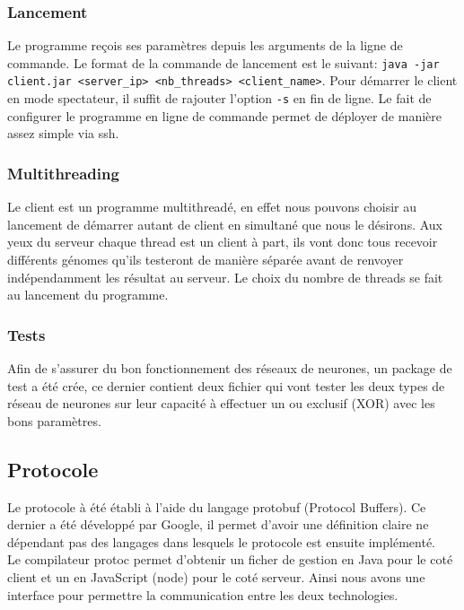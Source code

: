 \documentclass{article}
\begin{document}
\subsubsection{Lancement}

Le programme reçois ses paramètres depuis les arguments de la ligne de commande. Le format de la commande de lancement est le suivant: \texttt{java -jar client.jar <server\_ip> <nb\_threads> <client\_name>}. Pour démarrer le client en mode spectateur, il suffit de rajouter l'option \texttt{-s} en fin de ligne. Le fait de configurer le programme en ligne de commande permet de déployer de manière assez simple via ssh.  

\subsubsection{Multithreading}

Le client est un programme multithreadé, en effet nous pouvons choisir au lancement de démarrer autant de client en simultané que nous le désirons. Aux yeux du serveur chaque thread est un client à part, ils vont donc tous recevoir différents génomes qu'ils testeront de manière séparée avant de renvoyer indépendamment les résultat au serveur. Le choix du nombre de threads se fait au lancement du programme.

\subsubsection{Tests}

Afin de s'assurer du bon fonctionnement des réseaux de neurones, un package de test a été crée, ce dernier contient deux fichier qui vont tester les deux types de réseau de neurones sur leur capacité à effectuer un ou exclusif (XOR) avec les bons paramètres.

\subsection{Protocole}

Le protocole à été établi à l'aide du langage protobuf (Protocol Buffers). Ce dernier a été développé par Google, il permet d'avoir une définition claire ne dépendant pas des langages dans lesquels le protocole est ensuite implémenté.\\

Le compilateur protoc permet d'obtenir un ficher de gestion en Java pour le coté client et un en JavaScript (node) pour le coté serveur. Ainsi nous avons une interface pour permettre la communication entre les deux technologies.\\
\end{document}
